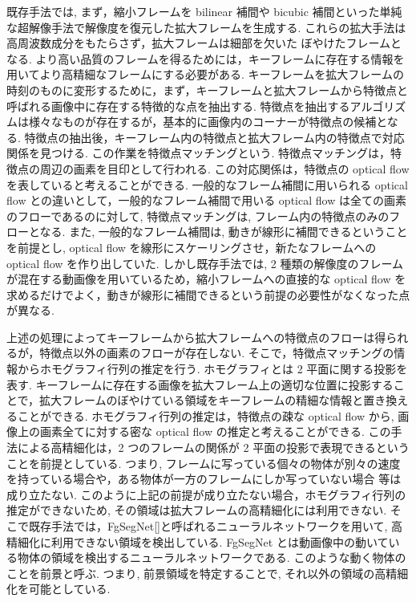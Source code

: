 \documentclass[a4paper,12pt]{jsreport}
\begin{document}
既存手法では, まず，縮小フレームを bilinear 補間や bicubic 補間といった単純な超解像手法で解像度を復元した拡大フレームを生成する. これらの拡大手法は高周波数成分をもたらさず，拡大フレームは細部を欠いた ぼやけたフレームとなる. より高い品質のフレームを得るためには，キーフレームに存在する情報を用いてより高精細なフレームにする必要がある. 
キーフレームを拡大フレームの時刻のものに変形するために，まず，キーフレームと拡大フレームから特徴点と呼ばれる画像中に存在する特徴的な点を抽出する. 特徴点を抽出するアルゴリズムは様々なものが存在するが，基本的に画像内のコーナーが特徴点の候補となる. 特徴点の抽出後，キーフレーム内の特徴点と拡大フレーム内の特徴点で対応関係を見つける. この作業を特徴点マッチングという. 
特徴点マッチングは，特徴点の周辺の画素を目印として行われる. この対応関係は，特徴点の optical flow を表していると考えることができる. 一般的なフレーム補間に用いられる optical flow との違いとして，一般的なフレーム補間で用いる optical flow は全ての画素のフローであるのに対して, 特徴点マッチングは, フレーム内の特徴点のみのフローとなる. また, 一般的なフレーム補間は, 動きが線形に補間できるということを前提とし, optical flow を線形にスケーリングさせ，新たなフレームへの optical flow を作り出していた. 
しかし既存手法では, 2 種類の解像度のフレームが混在する動画像を用いているため，縮小フレームへの直接的な optical flow を求めるだけでよく，動きが線形に補間できるという前提の必要性がなくなった点が異なる.

上述の処理によってキーフレームから拡大フレームへの特徴点のフローは得られるが，特徴点以外の画素のフローが存在しない. そこで，特徴点マッチングの情報からホモグラフィ行列の推定を行う. ホモグラフィとは 2 平面に関する投影を表す. キーフレームに存在する画像を拡大フレーム上の適切な位置に投影することで，拡大フレームのぼやけている領域をキーフレームの精細な情報と置き換えることができる. ホモグラフィ行列の推定は，特徴点の疎な optical flow から, 画像上の画素全てに対する密な optical flow の推定と考えることができる. この手法による高精細化は，2 つのフレームの関係が 2 平面の投影で表現できるということを前提としている. つまり, フレームに写っている個々の物体が別々の速度を持っている場合や，ある物体が一方のフレームにしか写っていない場合 等は成り立たない. このように上記の前提が成り立たない場合，ホモグラフィ行列の推定ができないため, その領域は拡大フレームの高精細化には利用できない. そこで既存手法では，FgSegNet[]と呼ばれるニューラルネットワークを用いて, 高精細化に利用できない領域を検出している. FgSegNet とは動画像中の動いている物体の領域を検出するニューラルネットワークである. このような動く物体のことを前景と呼ぶ. つまり, 前景領域を特定することで, それ以外の領域の高精細化を可能としている.
\end{document}
